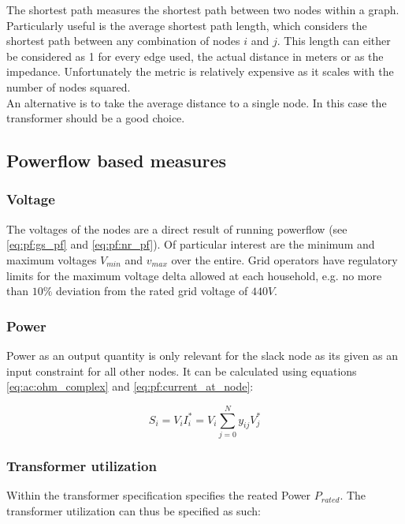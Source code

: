 The shortest path measures the shortest path between two nodes within a graph.
Particularly useful is the average shortest path length, which considers
the shortest path between any combination of nodes $i$ and $j$. This length can
either be considered as 1 for every edge used, the actual distance in meters or
as the impedance. Unfortunately
the metric is relatively expensive as it scales with the number of nodes squared.\\
An alternative is to take the average distance to a single node. In this case the
transformer should be a good choice.

\subsection{Powerflow based measures}

\subsubsection{Voltage}

The voltages of the nodes are a direct result of running powerflow 
(see \autoref{eq:pf:gs_pf} and \autoref{eq:pf:nr_pf}). Of particular
interest are the minimum and maximum voltages $V_{min}$ and $v_{max}$
over the entire. Grid operators have regulatory limits for the maximum
voltage delta allowed at each household, e.g. no more than $10\%$
deviation from the rated grid voltage of $440V$\autocite{venios}.

\subsubsection{Power}

Power as an output quantity is only relevant for the slack node as its
given as an input constraint for all other nodes. It can be calculated
using equations \ref{eq:ac:ohm_complex} and \ref{eq:pf:current_at_node}:

\begin{equation}
  S_i = V_i I_i^* = V_i \sum_{j = 0}^N y_{ij} V_j^*
\end{equation}

\subsubsection{Transformer utilization}

Within the transformer specification specifies the reated Power $P_{rated}$.
The transformer utilization can thus be specified as such:

